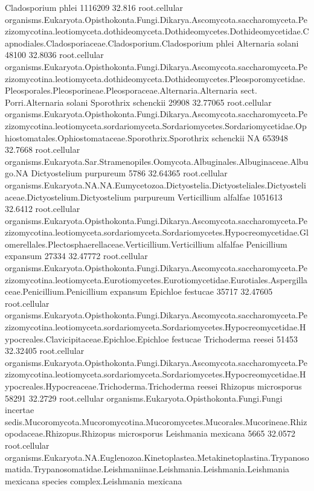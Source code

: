 \documentclass{article}
\begin{document}
\begin{Schunk}
\begin{Soutput}
 Cladosporium phlei 		 1116209 32.816 	 root.cellular organisms.Eukaryota.Opisthokonta.Fungi.Dikarya.Ascomycota.saccharomyceta.Pezizomycotina.leotiomyceta.dothideomyceta.Dothideomycetes.Dothideomycetidae.Capnodiales.Cladosporiaceae.Cladosporium.Cladosporium phlei
 Alternaria solani 		 48100 32.8036 	 root.cellular organisms.Eukaryota.Opisthokonta.Fungi.Dikarya.Ascomycota.saccharomyceta.Pezizomycotina.leotiomyceta.dothideomyceta.Dothideomycetes.Pleosporomycetidae.Pleosporales.Pleosporineae.Pleosporaceae.Alternaria.Alternaria sect. Porri.Alternaria solani
 Sporothrix schenckii 		 29908 32.77065 	 root.cellular organisms.Eukaryota.Opisthokonta.Fungi.Dikarya.Ascomycota.saccharomyceta.Pezizomycotina.leotiomyceta.sordariomyceta.Sordariomycetes.Sordariomycetidae.Ophiostomatales.Ophiostomataceae.Sporothrix.Sporothrix schenckii
 NA 		 653948 32.7668 	 root.cellular organisms.Eukaryota.Sar.Stramenopiles.Oomycota.Albuginales.Albuginaceae.Albugo.NA
 Dictyostelium purpureum 		 5786 32.64365 	 root.cellular organisms.Eukaryota.NA.NA.Eumycetozoa.Dictyostelia.Dictyosteliales.Dictyosteliaceae.Dictyostelium.Dictyostelium purpureum
 Verticillium alfalfae 		 1051613 32.6412 	 root.cellular organisms.Eukaryota.Opisthokonta.Fungi.Dikarya.Ascomycota.saccharomyceta.Pezizomycotina.leotiomyceta.sordariomyceta.Sordariomycetes.Hypocreomycetidae.Glomerellales.Plectosphaerellaceae.Verticillium.Verticillium alfalfae
 Penicillium expansum 		 27334 32.47772 	 root.cellular organisms.Eukaryota.Opisthokonta.Fungi.Dikarya.Ascomycota.saccharomyceta.Pezizomycotina.leotiomyceta.Eurotiomycetes.Eurotiomycetidae.Eurotiales.Aspergillaceae.Penicillium.Penicillium expansum
 Epichloe festucae 		 35717 32.47605 	 root.cellular organisms.Eukaryota.Opisthokonta.Fungi.Dikarya.Ascomycota.saccharomyceta.Pezizomycotina.leotiomyceta.sordariomyceta.Sordariomycetes.Hypocreomycetidae.Hypocreales.Clavicipitaceae.Epichloe.Epichloe festucae
 Trichoderma reesei 		 51453 32.32405 	 root.cellular organisms.Eukaryota.Opisthokonta.Fungi.Dikarya.Ascomycota.saccharomyceta.Pezizomycotina.leotiomyceta.sordariomyceta.Sordariomycetes.Hypocreomycetidae.Hypocreales.Hypocreaceae.Trichoderma.Trichoderma reesei
 Rhizopus microsporus 		 58291 32.2729 	 root.cellular organisms.Eukaryota.Opisthokonta.Fungi.Fungi incertae sedis.Mucoromycota.Mucoromycotina.Mucoromycetes.Mucorales.Mucorineae.Rhizopodaceae.Rhizopus.Rhizopus microsporus
 Leishmania mexicana 		 5665 32.0572 	 root.cellular organisms.Eukaryota.NA.Euglenozoa.Kinetoplastea.Metakinetoplastina.Trypanosomatida.Trypanosomatidae.Leishmaniinae.Leishmania.Leishmania.Leishmania mexicana species complex.Leishmania mexicana

\end{Soutput}
\end{Schunk}
\end{document}
